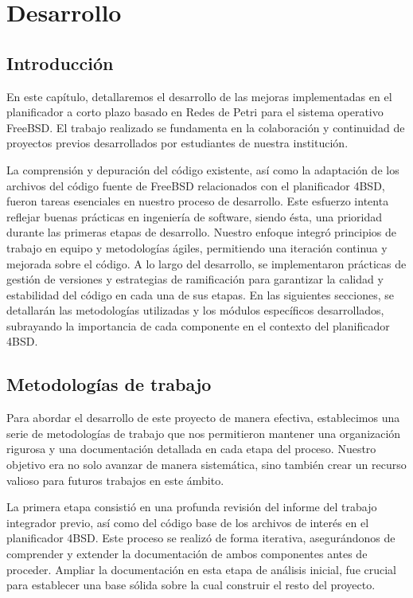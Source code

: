 \section{Desarrollo}

\subsection{Introducción}
En este capítulo, detallaremos el desarrollo de las mejoras implementadas en el planificador a corto plazo basado en Redes de Petri para el sistema operativo FreeBSD. El trabajo realizado se fundamenta en la colaboración y continuidad de proyectos previos desarrollados por estudiantes de nuestra institución.\par

La comprensión y depuración del código existente, así como la adaptación de los archivos del código fuente de FreeBSD relacionados con el planificador 4BSD, fueron tareas esenciales en nuestro proceso de desarrollo. Este esfuerzo intenta reflejar buenas prácticas en ingeniería de software, siendo ésta, una prioridad durante las primeras etapas de desarrollo. Nuestro enfoque integró principios de trabajo en equipo y metodologías ágiles, permitiendo una iteración continua y mejorada sobre el código. A lo largo del desarrollo, se implementaron prácticas de gestión de versiones y estrategias de ramificación para garantizar la calidad y estabilidad del código en cada una de sus etapas. En las siguientes secciones, se detallarán las metodologías utilizadas y los módulos específicos desarrollados, subrayando la importancia de cada componente en el contexto del planificador 4BSD.\par


\subsection{Metodologías de trabajo}
Para abordar el desarrollo de este proyecto de manera efectiva, establecimos una serie de metodologías de trabajo que nos permitieron mantener una organización rigurosa y una documentación detallada en cada etapa del proceso. Nuestro objetivo era no solo avanzar de manera sistemática, sino también crear un recurso valioso para futuros trabajos en este ámbito.

La primera etapa consistió en una profunda revisión del informe del trabajo integrador previo, así como del código base de los archivos de interés en el planificador 4BSD. Este proceso se realizó de forma iterativa, asegurándonos de comprender y extender la documentación de ambos componentes antes de proceder. Ampliar la documentación en esta etapa de análisis inicial, fue crucial para establecer una base sólida sobre la cual construir el resto del proyecto.

